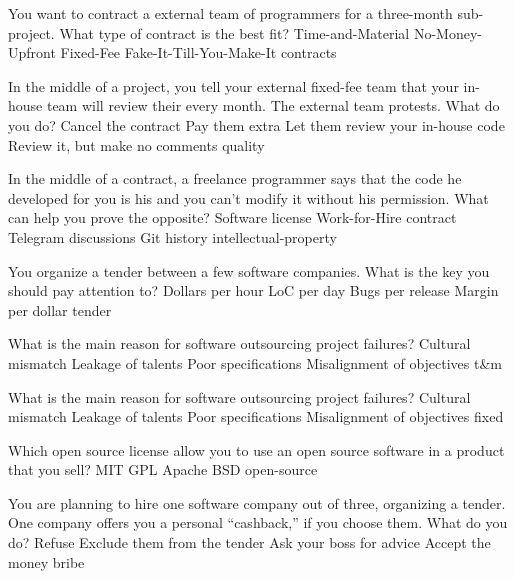 \documentclass{article}
\begin{document}

\pmbaQuestion
  {You want to contract a  external team of programmers
    for a three-month sub-project. What type of contract is the best fit?}
  {Time-and-Material}
  {No-Money-Upfront}
  {Fixed-Fee}
  {Fake-It-Till-You-Make-It}
  {contracts}

\pmbaQuestion
  {In the middle of a project, you tell your external fixed-fee team
    that your in-house team will review their  every month.
    The external team protests. What do you do?}
  {Cancel the contract}
  {Pay them extra}
  {Let them review your in-house code}
  {Review it, but make no comments}
  {quality}

\pmbaQuestion
  {In the middle of a contract, a freelance programmer says that the code
    he developed for you is his  and you can't modify
    it without his permission. What can help you prove the opposite?}
  {Software license}
  {Work-for-Hire contract}
  {Telegram discussions}
  {Git history}
  {intellectual-property}

\pmbaQuestion
  {You organize a tender between a few software  companies.
    What is the key  you should pay attention to?}
  {Dollars per hour}
  {LoC per day}
  {Bugs per release}
  {Margin per dollar}
  {tender}

\pmbaQuestion
  {What is the main reason for software outsourcing
     project failures?}
  {Cultural mismatch}
  {Leakage of talents}
  {Poor specifications}
  {Misalignment of objectives}
  {t\&m}

\pmbaQuestion
  {What is the main reason for software outsourcing  project failures?}
  {Cultural mismatch}
  {Leakage of talents}
  {Poor specifications}
  {Misalignment of objectives}
  {fixed}

\pmbaQuestion
  {Which open source license  allow you to use
    an open source software in a product that you sell?}
  {MIT}
  {GPL}
  {Apache}
  {BSD}
  {open-source}

\pmbaQuestion
  {You are planning to hire one software company out of three, organizing a tender.
    One company offers you a personal ``cashback,'' if you choose them.
    What do you do?}
  {Refuse}
  {Exclude them from the tender}
  {Ask your boss for advice}
  {Accept the money}
  {bribe}

\end{document}
